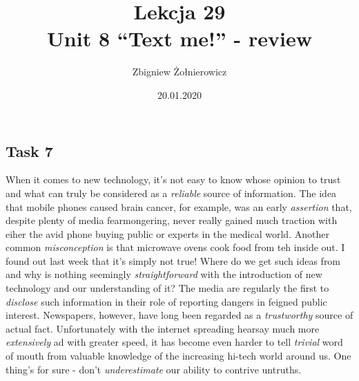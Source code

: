 \documentclass[a4paper]{article}
\begin{document}
\title{{\huge Lekcja 29} \\
{\large Unit 8 ``Text me!'' - review}}
\author{Zbigniew Żołnierowicz}
\date{20.01.2020}
\maketitle
\subsection{Task 7}
When it comes to new technology, it's not easy to know whose opinion to trust and what can truly be considered as a \emph{reliable} source of information.
The idea that mobile phones caused brain cancer, for example, was an early \emph{assertion} that, despite plenty of media fearmongering, never really gained much traction with eiher the avid phone buying public or experts in the medical world.
Another common \emph{misconception} is that microwave ovens cook food from teh inside out. I found out last week that it's simply not true!
Where do we get such ideas from and why is nothing seemingly \emph{straightforward} with the introduction of new technology and our understanding of it?
The media are regularly the first to \emph{disclose} such information in their role of reporting dangers in feigned public interest. Newspapers, however, have long been regarded as a \emph{trustworthy} source of actual fact.
Unfortunately with the internet spreading hearsay much more \emph{extensively} ad with greater speed, it has become even harder to tell \emph{trivial} word of mouth from valuable knowledge of the increasing hi-tech world around us.
One thing's for sure - don't \emph{underestimate} our ability to contrive untruths.
\end{document}
